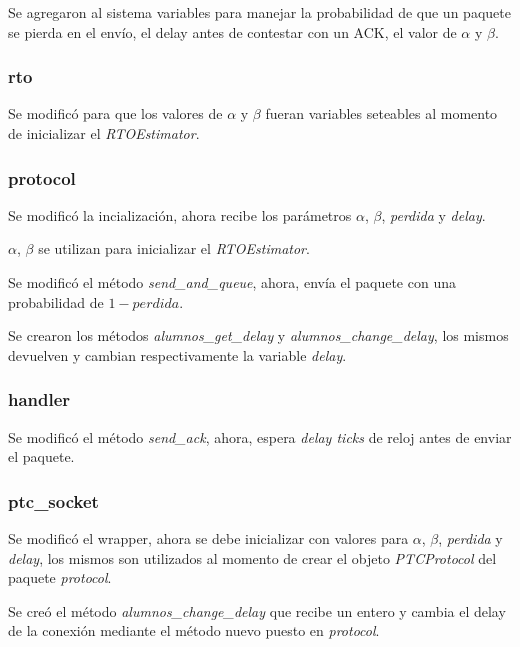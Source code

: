     Se agregaron al sistema variables para manejar la probabilidad de que 
    un paquete se pierda en el env\'io, el delay antes de contestar con 
    un ACK, el valor de $\alpha$ y $\beta$.

\subsubsection{rto}
    Se modific\'o para que los valores de $\alpha$ y $\beta$ fueran 
    variables seteables al momento de inicializar el \textit{RTOEstimator}.
    
\subsubsection{protocol}
    Se modific\'o la incializaci\'on, ahora recibe los par\'ametros 
    $\alpha$, $\beta$, \textit{perdida} y \textit{delay}.
    
    $\alpha$, $\beta$ se utilizan para inicializar el \textit{RTOEstimator}.
    
    Se modific\'o el m\'etodo \textit{send_and_queue}, ahora, env\'ia 
    el paquete con una probabilidad de $1-perdida$.
    
    Se crearon los m\'etodos \textit{alumnos_get_delay} y 
    \textit{alumnos_change_delay}, los mismos devuelven y cambian
    respectivamente la variable \textit{delay}.
    
\subsubsection{handler}
    Se modific\'o el m\'etodo \textit{send_ack}, ahora, espera 
    \textit{delay ticks} de reloj antes de enviar el paquete.
    
\subsubsection{ptc_socket}
    Se modific\'o el wrapper, ahora se debe inicializar con valores para 
    $\alpha$, $\beta$, \textit{perdida} y \textit{delay}, los mismos son
    utilizados al momento de crear el objeto \textit{PTCProtocol} del 
    paquete \textit{protocol}.
    
    Se cre\'o el m\'etodo \textit{alumnos_change_delay} que recibe un
    entero y cambia el delay de la conexi\'on mediante el m\'etodo nuevo
    puesto en \textit{protocol}.
